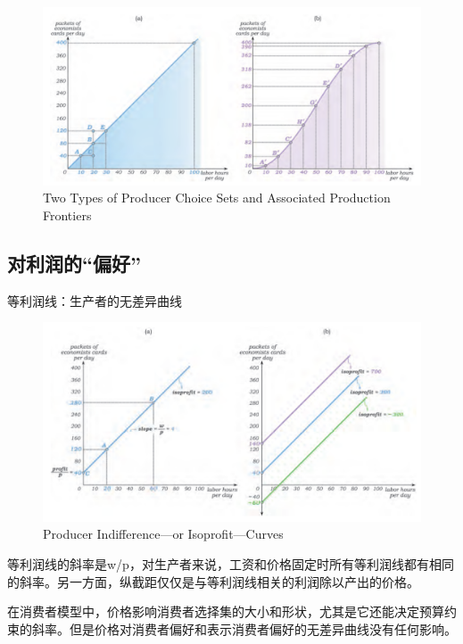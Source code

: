 \documentclass{article}
\begin{document}
\begin{figure}[H] %
	\centering %
	\includegraphics[width=1\textwidth]{11_1} %
	\caption{Two Types of Producer Choice Sets and Associated Production Frontiers} %
	\label{Fig.main2} %
\end{figure}

\subsection{对利润的“偏好”}
等利润线：生产者的无差异曲线
\begin{figure}[H] %
	\centering %
	\includegraphics[width=1\textwidth]{11_2} %
	\caption{Producer Indifference—or Isoprofit—Curves} %
	\label{Fig.main3} %
\end{figure}

等利润线的斜率是w/p，对生产者来说，工资和价格固定时所有等利润线都有相同的斜率。另一方面，纵截距仅仅是与等利润线相关的利润除以产出的价格。

在消费者模型中，价格影响消费者选择集的大小和形状，尤其是它还能决定预算约束的斜率。但是价格对消费者偏好和表示消费者偏好的无差异曲线没有任何影响。
\end{document}
